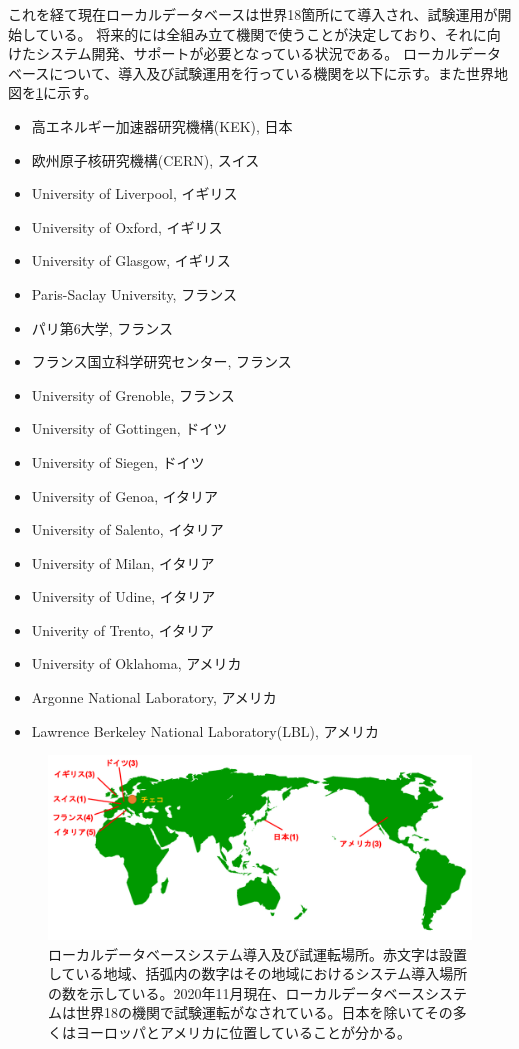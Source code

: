 これを経て現在ローカルデータベースは世界18箇所にて導入され、試験運用が開始している。
将来的には全組み立て機関で使うことが決定しており、それに向けたシステム開発、サポートが必要となっている状況である。
ローカルデータベースについて、導入及び試験運用を行っている機関を以下に示す。また世界地図を\ref{localdb_world_map}に示す。

\begin{itemize}
  \item 高エネルギー加速器研究機構(KEK), 日本
  \item 欧州原子核研究機構(CERN), スイス
  \item University of Liverpool, イギリス
  \item University of Oxford, イギリス
  \item University of Glasgow, イギリス
  \item Paris-Saclay University, フランス
  \item パリ第6大学, フランス
  \item フランス国立科学研究センター, フランス
  \item University of Grenoble, フランス
  \item University of Gottingen, ドイツ
  \item University of Siegen, ドイツ
  \item University of Genoa, イタリア
  \item University of Salento, イタリア
  \item University of Milan, イタリア
  \item University of Udine, イタリア
  \item Univerity of Trento, イタリア
  \item University of Oklahoma, アメリカ
  \item Argonne National Laboratory, アメリカ
  \item Lawrence Berkeley National Laboratory(LBL), アメリカ
\end{itemize}

\begin{figure}[bpt]\centering
\includegraphics[width=14cm]{localdb_world_map}
\caption[ローカルデータベースシステム導入及び試運転場所]{ローカルデータベースシステム導入及び試運転場所。赤文字は設置している地域、括弧内の数字はその地域におけるシステム導入場所の数を示している。2020年11月現在、ローカルデータベースシステムは世界18の機関で試験運転がなされている。日本を除いてその多くはヨーロッパとアメリカに位置していることが分かる。}
\label{localdb_world_map}
\end{figure}


